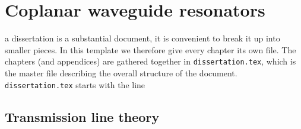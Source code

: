 \section{Coplanar waveguide resonators}

 a dissertation is a substantial document, it is convenient to break it up into smaller pieces. In this template we therefore give every chapter its own file. The chapters (and appendices) are gathered together in \texttt{dissertation.tex}, which is the master file describing the overall structure of the document. \texttt{dissertation.tex} starts with the line

\subsection{Transmission line theory}

